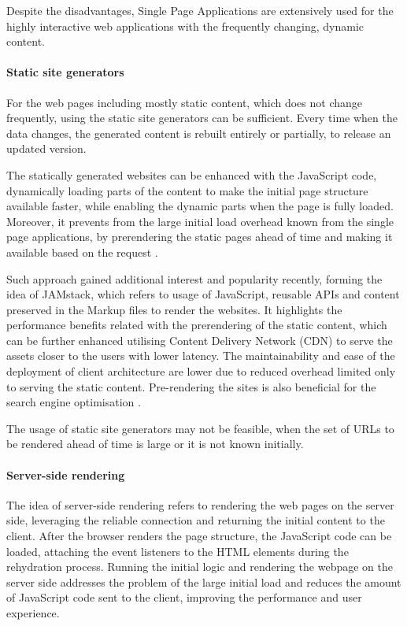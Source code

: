 Despite the disadvantages, Single Page Applications are extensively used for the highly interactive web applications with the frequently changing, dynamic content.

\paragraph{Static site generators} \label{chapter:client-application-tier-static-site-generators}

For the web pages including mostly static content, which does not change frequently, using the static site generators can be sufficient. Every time when the data changes, the generated content is rebuilt entirely or partially, to release an updated version.

The statically generated websites can be enhanced with the JavaScript code, dynamically loading parts of the content to make the initial page structure available faster, while enabling the dynamic parts when the page is fully loaded. Moreover, it prevents from the large initial load overhead known from the single page applications, by prerendering the static pages ahead of time and making it available based on the request \cite{GoogleRenderingOnTheWeb}.

Such approach gained additional interest and popularity recently, forming the idea of JAMstack, which refers to usage of JavaScript, reusable APIs and content preserved in the Markup files to render the websites. It highlights the performance benefits related with the prerendering of the static content, which can be further enhanced utilising Content Delivery Network (CDN) to serve the assets closer to the users with lower latency. The maintainability and ease of the deployment of client architecture are lower due to reduced overhead limited only to serving the static content. Pre-rendering the sites is also beneficial for the search engine optimisation \cite{JAMstack}.

The usage of static site generators may not be feasible, when the set of URLs to be rendered ahead of time is large or it is not known initially.

\paragraph{Server-side rendering} \label{chapter:client-application-tier-server-side-rendering}

The idea of server-side rendering refers to rendering the web pages on the server side, leveraging the reliable connection and returning the initial content to the client. After the browser renders the page structure, the JavaScript code can be loaded, attaching the event listeners to the HTML elements during the rehydration process. Running the initial logic and rendering the webpage on the server side addresses the problem of the large initial load and reduces the amount of JavaScript code sent to the client, improving the performance and user experience.

